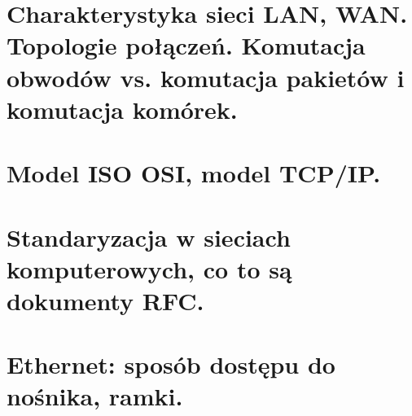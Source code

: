\documentclass{unibooklet}
\begin{document}


    \section{Charakterystyka sieci LAN, WAN. Topologie połączeń. Komutacja obwodów vs. komutacja
    pakietów i komutacja komórek.}
    

    \section{Model ISO OSI, model TCP/IP.}
    

    \section{Standaryzacja w sieciach komputerowych, co to są dokumenty RFC.}
    

    \section{Ethernet: sposób dostępu do nośnika, ramki.}
    
\end{document}
